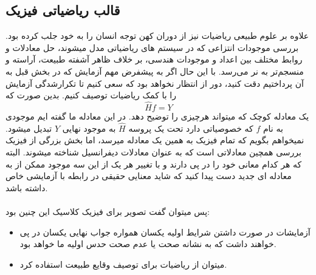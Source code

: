 \documentclass[9pt, twocolumn]{article}
\begin{document}
        \subsection{قالب ریاضیاتی فیزیک}
            علاوه بر علوم طبیعی ریاضیات نیز از دوران کهن توجه انسان را به خود جلب کرده بود. بررسی موجودات انتزاعی که در سیستم های ریاضیاتی مدل میشوند، حل معادلات و روابط مختلف بین اعداد و موجودات هندسی، بر خلاف ظاهر آشفته طبیعت، آراسته و منسجم‌تر به نر می‌رسد. با این حال اگر به پیشفرض مهم آزمایش که در بخش قبل به آن پرداختیم دقت کنید، دور از انتظار نخواهد بود که سعی کنیم تا تکرارشدگی آزمایش را با کمک ریاضیات توصیف کنیم. بدین صورت که
            \begin{equation}
                \hat H f = Y
            \end{equation}
            یک معادله کوچک که میتواند هرچیزی را توضیح دهد. در این معادله ما گفته ایم موجودی به نام $f$ که خصوصیاتی دارد تحت یک پروسه $\hat H$ به موجود نهایی $Y$ تبدیل میشود. نمیخواهم بگویم که تمام فیزیک به همین یک معادله میرسد، اما بخش بزرگی از فیزیک بررسی همچین معادلاتی است که به عنوان معادلات دیفرانسیل شناخته میشوند. البته که هر کدام معانی خود را در پی دارند و با تغییر هر یک از این سه موجود ممکن از به معادله ای جدید دست پیدا کنید که شاید معنایی حقیقی در رابطه با آزمایشی خاص داشته باشد.
            \\
            \\
            پس میتوان گفت تصویر برای فیزیک کلاسیک این چنین بود:
            \begin{itemize}
                \item آزمایشات در صورت داشتن شرایط اولیه یکسان همواره جواب نهایی یکسان در پی خواهند داشت که به نشانه صحت یا عدم صحت حدس اولیه ما خواهد بود. 
                \item میتوان از ریاضیات برای توصیف وقایع طبیعت استفاده کرد.
            \end{itemize}
\end{document}
